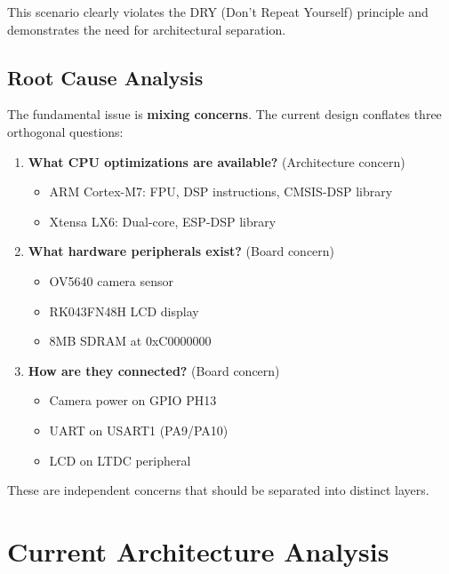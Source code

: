 \documentclass[11pt,a4paper]{article}
\begin{document}
This scenario clearly violates the DRY (Don't Repeat Yourself) principle and demonstrates the need for architectural separation.

\subsection{Root Cause Analysis}

The fundamental issue is \textbf{mixing concerns}. The current design conflates three orthogonal questions:

\begin{enumerate}
    \item \textbf{What CPU optimizations are available?} (Architecture concern)
    \begin{itemize}
        \item ARM Cortex-M7: FPU, DSP instructions, CMSIS-DSP library
        \item Xtensa LX6: Dual-core, ESP-DSP library
    \end{itemize}

    \item \textbf{What hardware peripherals exist?} (Board concern)
    \begin{itemize}
        \item OV5640 camera sensor
        \item RK043FN48H LCD display
        \item 8MB SDRAM at 0xC0000000
    \end{itemize}

    \item \textbf{How are they connected?} (Board concern)
    \begin{itemize}
        \item Camera power on GPIO PH13
        \item UART on USART1 (PA9/PA10)
        \item LCD on LTDC peripheral
    \end{itemize}
\end{enumerate}

These are independent concerns that should be separated into distinct layers.

\section{Current Architecture Analysis}
\end{document}
